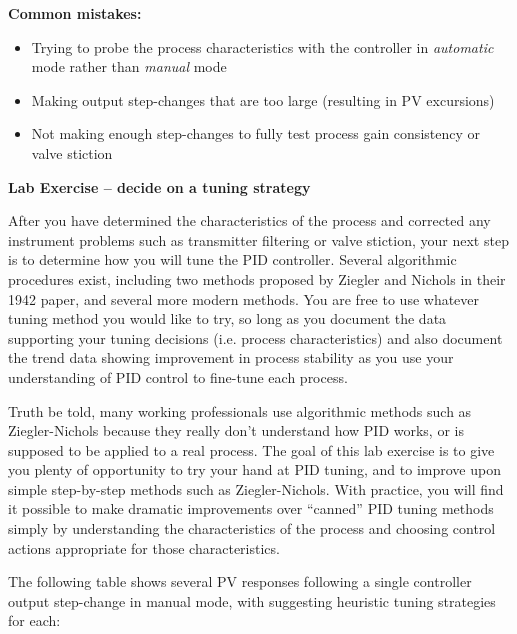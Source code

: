 \documentclass[12pt,a4paper]{article}
\begin{document}
\vskip 10pt

{\bf Common mistakes:}

\begin{itemize}
\item{} Trying to probe the process characteristics with the controller in {\it automatic} mode rather than {\it manual} mode
\item{} Making output step-changes that are too large (resulting in PV excursions)
\item{} Not making enough step-changes to fully test process gain consistency or valve stiction
\end{itemize}







\vfil \eject

\noindent
{\bf Lab Exercise -- decide on a tuning strategy}

\vskip 5pt

After you have determined the characteristics of the process and corrected any instrument problems such as transmitter filtering or valve stiction, your next step is to determine how you will tune the PID controller.  Several algorithmic procedures exist, including two methods proposed by Ziegler and Nichols in their 1942 paper, and several more modern methods.  You are free to use whatever tuning method you would like to try, so long as you document the data supporting your tuning decisions (i.e. process characteristics) and also document the trend data showing improvement in process stability as you use your understanding of PID control to fine-tune each process.

Truth be told, many working professionals use algorithmic methods such as Ziegler-Nichols because they really don't understand how PID works, or is supposed to be applied to a real process.  The goal of this lab exercise is to give you plenty of opportunity to try your hand at PID tuning, and to improve upon simple step-by-step methods such as Ziegler-Nichols.  With practice, you will find it possible to make dramatic improvements over ``canned'' PID tuning methods simply by understanding the characteristics of the process and choosing control actions appropriate for those characteristics.

\vskip 10pt

The following table shows several PV responses following a single controller output step-change in manual mode, with suggesting heuristic tuning strategies for each:
\end{document}
